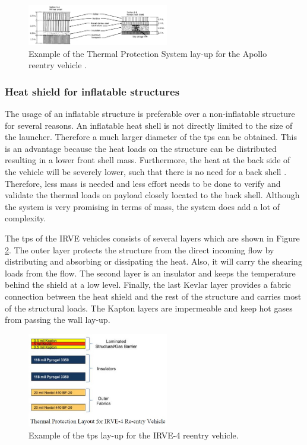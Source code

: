 \begin{figure}[H]
\centering
\includegraphics[width = 0.55\textwidth]{Figure/tpsApollo.png}
\caption[Example of the Thermal Protection System lay-up for the Apollo reentry vehicle]{Example of the Thermal Protection System lay-up for the Apollo reentry vehicle \cite[p.5]{Pavlosky1974}.}
\label{fig:tpslayupapollo}
\end{figure}

\subsubsection*{Heat shield for inflatable structures}

The usage of  an inflatable structure is preferable over a non-inflatable structure for several reasons. An inflatable heat shell is not directly limited to the size of the launcher. Therefore a much larger diameter of the \gls{tps} can be obtained. This is an advantage because the heat loads on the structure can be distributed resulting in a lower front shell mass. Furthermore, the heat at the back side of the vehicle will be severely lower, such that there is no need for a back shell \cite{Hughes2005}. Therefore, less mass is needed and less effort needs to be done to verify and validate the thermal loads on payload closely located to the back shell. Although the system is very promising in terms of mass, the system does add a lot of complexity. 

The \gls{tps} of the IRVE vehicles consists of several layers \cite{Litton2011} which are shown in Figure \ref{fig:tpslayup}. The outer layer protects the structure from the direct incoming flow by distributing and absorbing or dissipating the heat. Also, it will carry the shearing loads from the flow. The second layer is an insulator and keeps the temperature behind the shield at a low level. Finally, the last Kevlar layer provides a fabric connection between the heat shield and the rest of the structure and carries most of the structural loads. The Kapton layers are impermeable and keep hot gases from passing the wall lay-up.

\begin{figure}[H]
\centering
\includegraphics[width = 0.55\textwidth]{Figure/IRVE4TPS.jpg}
\caption[Example of the \gls{tps} lay-up for the IRVE-4 reentry vehicle]{Example of the \gls{tps} lay-up for the IRVE-4 reentry vehicle\cite[p.6]{Litton2011}.}
\label{fig:tpslayup}
\end{figure}

